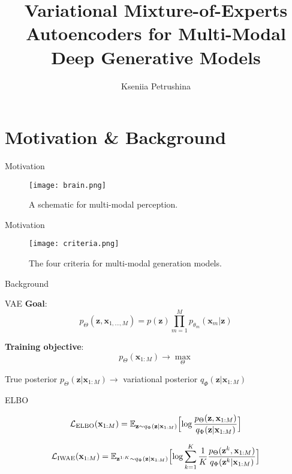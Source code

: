 \documentclass{beamer}
\title{Variational Mixture-of-Experts Autoencoders for Multi-Modal Deep Generative Models}
\author{Kseniia Petrushina}
\institute{MIPT, 2023}
\begin{document}
\begin{frame}
    \titlepage
\end{frame}


\begin{frame}
    \tableofcontents
\end{frame}


\section{Motivation \& Background}
\begin{frame}{Motivation}
    \begin{figure}
        \centering
        \texttt{[image: brain.png]}
        \caption{A schematic for multi-modal perception.}
        \label{fig:brain}
    \end{figure}
\end{frame}

\begin{frame}{Motivation}
    \begin{figure}
        \centering
        \texttt{[image: criteria.png]}
        \caption{The four criteria for multi-modal generation models.}
        \label{fig:criteria}
    \end{figure}
\end{frame}


\begin{frame}{Background}
 \begin{block}{VAE}
    \textbf{Goal}: $$p_\Theta(\textbf{z}, \textbf{x}_{1, \dots, M}) = p(\textbf{z})\prod\limits_{m=1}^M p_{\theta_m}(\textbf{x}_m | \textbf{z})$$

    \textbf{Training objective}: $$p_\Theta (\textbf{x}_{1:M}) \to \max\limits_\Theta$$

    True posterior $ p_\Theta(\textbf{z}| \textbf{x}_{1: M}) \to $ variational posterior $q_\Phi(\textbf{z}| \textbf{x}_{1: M})$
    
\end{block}
    
\begin{block}{ELBO}

    $$\mathcal{L}_\text{ELBO}(\textbf{x}_{1:M}) = \mathbb{E}_{\textbf{z}\sim q_\Phi (\textbf{z}| \textbf{x}_{1: M})} \Bigl[ \log \dfrac{p_\Theta(\textbf{z}, \textbf{x}_{1:M})}{q_\Phi (\textbf{z} | \textbf{x}_{1:M})} \Bigr]$$

    $$\mathcal{L}_\text{IWAE}(\textbf{x}_{1:M}) = \mathbb{E}_{\textbf{z}^{1:K}\sim q_\Phi (\textbf{z} | \textbf{x}_{1: M})} \Bigl[ \log \sum\limits_{k=1}^K \dfrac1K \dfrac{p_\Theta(\textbf{z}^k, \textbf{x}_{1:M})}{q_\Phi (\textbf{z}^k | \textbf{x}_{1:M})} \Bigr] $$
\end{block}
\end{frame}
\end{document}
